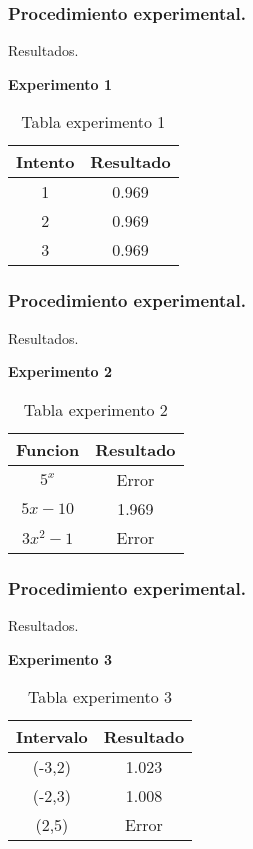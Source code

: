\documentclass{beamer}
\begin{document}
\begin{frame}

\frametitle{Procedimiento experimental.}
{\LARGE Resultados.}

\textbf{Experimento 1}
\begin{table}[!ht]
\begin{center}
\begin{tabular}{|c|c|}\hline
{\bf Intento} & {\bf Resultado}\\ \hline
1 & 0.969\\
2 & 0.969\\
3 & 0.969\\
\hline
\end{tabular}
\end{center}
\caption{Tabla experimento 1}
\label{Mitabla}
\end{table}
\end{frame}

\begin{frame}
\frametitle{Procedimiento experimental.}
{\LARGE Resultados.}

\textbf{Experimento 2}
\begin{table}[!ht]
\begin{center}
\begin{tabular}{|c|c|}\hline
{\bf Funcion} & {\bf Resultado}\\ \hline
$5^x$ & Error\\
$5x-10$ & 1.969\\
$3x^2-1$ & Error\\
\hline
\end{tabular}
\end{center}
\caption{Tabla experimento 2}
\label{Mitabla2}
\end{table}
\end{frame}

\begin{frame}
\frametitle{Procedimiento experimental.}
{\LARGE Resultados.}

\textbf{Experimento 3}
\begin{table}[!h]
\begin{center}
\begin{tabular}{|c|c|}\hline
{\bf Intervalo} & {\bf Resultado}\\ \hline
(-3,2) & 1.023\\
(-2,3) & 1.008\\
(2,5) & Error\\%
\hline
\end{tabular}
\end{center}
\caption{Tabla experimento 3}
\label{Mitabla3}
\end{table}
\end{frame}
\end{document}
